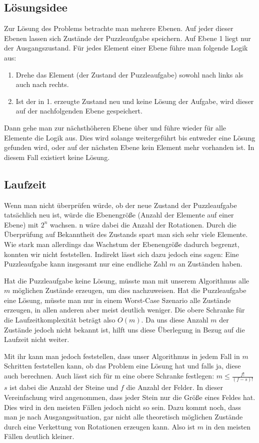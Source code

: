 \subsection {Lösungsidee}
	Zur Lösung des Problems betrachte man mehrere Ebenen. Auf jeder dieser Ebenen lassen sich Zustände der Puzzleaufgabe speichern. 
	Auf Ebene 1 liegt nur der Ausgangszustand. Für jedes Element einer Ebene führe man folgende Logik aus:

	\begin{enumerate}
		\item Drehe das Element (der Zustand der Puzzleaufgabe) sowohl nach links als auch nach rechts.
		\item Ist der in 1. erzeugte Zustand neu und keine Lösung der Aufgabe, wird dieser auf der nachfolgenden Ebene gespeichert.
	\end{enumerate}

	Dann gehe man zur nächsthöheren Ebene über und führe wieder für alle Elemente die Logik aus.
	Dies wird solange weitergeführt bis entweder eine Lösung gefunden wird, oder auf der nächsten Ebene kein Element mehr vorhanden ist.
	In diesem Fall existiert keine Lösung.

	
\subsection{Laufzeit}
	Wenn man nicht überprüfen würde, ob der neue Zustand der Puzzleaufgabe tatsächlich neu ist, würde die Ebenengröße (Anzahl der Elemente auf einer Ebene) mit \(2^n\) wachsen.  
	n wäre dabei die Anzahl der Rotationen. Durch die Überprüfung auf Bekanntheit des Zustands spart man sich sehr viele Elemente. 
	Wie stark man allerdings das Wachstum der Ebenengröße dadurch begrenzt, konnten wir nicht feststellen. Indirekt lässt sich dazu jedoch eins sagen: 
	Eine Puzzleaufgabe kann insgesamt nur eine endliche Zahl \(m\) an Zuständen haben. 

	Hat die Puzzleaufgabe keine Lösung, müsste man mit unserem Algorithmus alle \(m\) möglichen Zustände erzeugen, um dies nachzuweisen.
	Hat die Puzzleaufgabe eine Lösung, müsste man nur in einem Worst-Case Szenario alle  Zustände erzeugen, in allen anderen aber meist deutlich weniger.
	Die obere Schranke für die Laufzeitkomplexität beträgt also \(O(m)\). Da uns diese Anzahl \(m\) der Zustände jedoch nicht bekannt ist, 
	hilft uns diese Überlegung in Bezug auf die Laufzeit nicht weiter. 

	Mit ihr kann man jedoch feststellen, dass unser Algorithmus in jedem Fall in \(m\) Schritten feststellen kann, ob das Problem eine Lösung hat und falls ja, diese auch berechnen. 
	Auch lässt sich für m eine obere Schranke festlegen: \(m \le \frac{f!}{(f-s)!}\) \(s\) ist dabei die Anzahl der Steine und \(f\) die Anzahl der Felder. 
	In dieser Vereinfachung wird angenommen, dass jeder Stein nur die Größe eines Feldes hat. Dies wird in den meisten Fällen jedoch nicht so sein.
	Dazu kommt noch, dass man je nach Ausgangssituation, 
	gar nicht alle theoretisch möglichen Zustände durch eine Verkettung von Rotationen erzeugen kann. 
	Also ist \(m\) in den meisten Fällen deutlich kleiner. 

